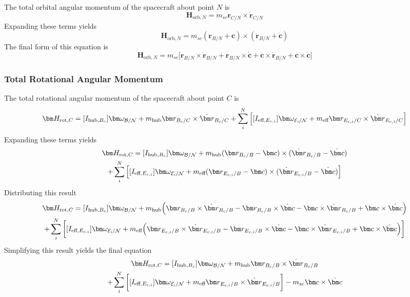 The total orbital angular momentum of the spacecraft about point $N$ is
\begin{equation}
\bm H_{\text{orb},N} = m_{sc} \bm r_{C/N} \times \dot{\bm r}_{C/N}
\end{equation}
Expanding these terms yields
\begin{equation}
\bm H_{\text{orb},N} = m_{sc} (\bm r_{B/N} + \bm c) \times (\dot{\bm r}_{B/N} + \dot{\bm c})
\end{equation}
The final form of this equation is
\begin{equation}
\bm H_{\text{orb},N} = m_{sc} \Big[\bm r_{B/N} \times \dot{\bm r}_{B/N} + \bm r_{B/N} \times \dot{\bm c} + \bm c \times \dot{\bm r}_{B/N} + \bm c \times \dot{\bm c}\Big]
\end{equation}

\subsubsection{Total Rotational Angular Momentum}

The total rotational angular momentum of the spacecraft about point $C$ is
\begin{multline}
\bm H_{\text{rot},C} = [I_{\text{hub},B_c}] \bm \omega_{\cal{B/N}} + m_{\text{hub}} \bm r_{B_c/C}\times \dot{\bm r}_{B_c/C}
+ \sum\limits_{i}^{N}\Big[[I_{\text{eff},E_{c,i}}] \bm \omega_{\cal{E}_{\textit{i}}/\cal{N}}
+ m_{\text{eff}} \bm r_{E_{c,i}/C} \times \dot{\bm r}_{E_{c,i}/C} \Big]
\end{multline}
Expanding these terms yields
\begin{multline}
\bm H_{\text{rot},C} = [I_{\text{hub},B_c}] \bm \omega_{\cal{B/N}} + m_{\text{hub}} (\bm r_{B_c/B} - \bm c)\times (\dot{\bm r}_{B_c/B} - \dot{\bm c})\\
+ \sum\limits_{i}^{N}\Big[[I_{\text{eff},E_{c,i}}] \bm \omega_{\cal{E}_{\textit{i}}/\cal{N}}
+ m_{\text{eff}} (\bm r_{E_{c,i}/B} - \bm c) \times (\dot{\bm r}_{E_{c,i}/B} - \dot{\bm c}) \Big]
\end{multline}
Distributing this result
\begin{multline}
\bm H_{\text{rot},C} = [I_{\text{hub},B_c}] \bm \omega_{\cal{B/N}} + m_{\text{hub}} \Big(\bm r_{B_c/B} \times \dot{\bm r}_{B_c/B} - \bm r_{B_c/B} \times \dot{\bm c} - \bm c \times \dot{\bm r}_{B_c/B} + \bm c \times \dot{\bm c}\Big)\\
+ \sum\limits_{i}^{N}\bigg[[I_{\text{eff},E_{c,i}}] \bm \omega_{\cal{E}_{\textit{i}}/\cal{N}}
+ m_{\text{eff}} \Big(\bm r_{E_{c,i}/B} \times \dot{\bm r}_{E_{c,i}/B} - \bm r_{E_{c,i}/B} \times \dot{\bm c} - \bm c \times \dot{\bm r}_{E_{c,i}/B} + \bm c \times \dot{\bm c}\Big) \bigg]
\end{multline}
Simplifying this result yields the final equation
\begin{multline}
\bm H_{\text{rot},C} = [I_{\text{hub},B_c}] \bm \omega_{\cal{B/N}} + m_{\text{hub}} \bm r_{B_c/B} \times \dot{\bm r}_{B_c/B}\\
+ \sum\limits_{i}^{N}\bigg[[I_{\text{eff},E_{c,i}}] \bm \omega_{\cal{E}_{\textit{i}}/\cal{N}}
+ m_{\text{eff}} \bm r_{E_{c,i}/B} \times \dot{\bm r}_{E_{c,i}/B} \bigg] - m_{sc} \bm c \times \dot{\bm c}
\end{multline}

